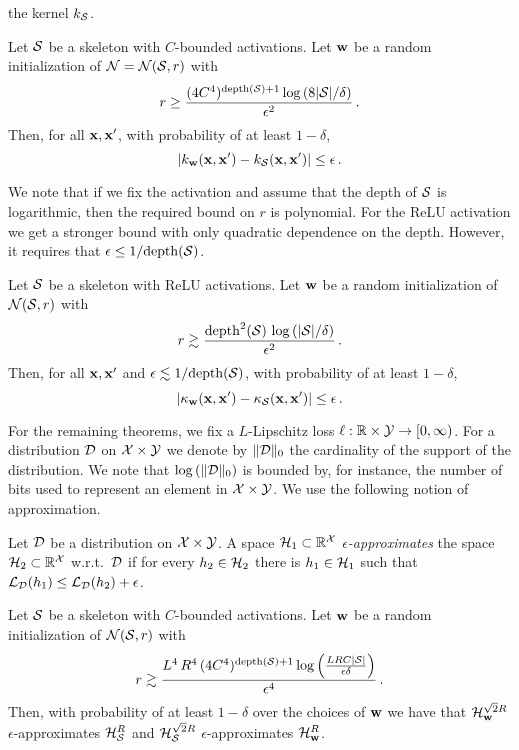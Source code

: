 the kernel $k_{\cal S}$.
\begin{theorem}\label{thm:main_ker}
Let ${\cal S}$ be a skeleton with $C$-bounded activations. Let ${\mathbf w}$ be a random
initialization of ${\cal N}={\cal N}({\cal S},r)$ with
$$r \ge \frac
	{(4C^4)^{\mathrm{depth}({\cal S})+1} \log\left({8|{\cal S}|}/{\delta}\right)}
	{\epsilon^2} \,.$$
Then, for all ${\mathbf x},{\mathbf x}'$, with probability of at least $1-\delta$,
$$|k_{\mathbf w}({\mathbf x},{\mathbf x}')-k_{\cal S}({\mathbf x},{\mathbf x}')|\le \epsilon\,.$$
\end{theorem}
%
\noindent We note that if we fix the activation and assume that the depth of ${\cal S}$ is
logarithmic, then the required bound on $r$ is polynomial. For the
ReLU activation we get a stronger bound with only quadratic dependence on
the depth. However, it requires that $\epsilon\le{1}/{\mathrm{depth}({\cal S})}$.
%
\begin{theorem}\label{thm:main_ker_ReLU}
Let ${\cal S}$ be a skeleton with ReLU activations. Let ${\mathbf w}$ be a random
initialization of ${\cal N}({\cal S},r)$ with
$$
	r \gtrsim \frac{\mathrm{depth}^2({\cal S}) \,
		\log\left({|{\cal S}|}/{\delta}\right)}
	{\epsilon^2} \,.
$$
Then, for all ${\mathbf x},{\mathbf x}'$ and $\epsilon\lesssim{}1/{\mathrm{depth}({\cal S})}$, with
probability of at least $1-\delta$,
$$ |\kappa_{\mathbf w}({\mathbf x},{\mathbf x}')-\kappa_{\cal S}({\mathbf x},{\mathbf x}')|\le \epsilon \,.$$
\end{theorem}
%
\noindent For the remaining theorems, we fix a $L$-Lipschitz loss
$\ell:{\mathbb R}\times{\cal Y}\to [0,\infty)$.  For a distribution ${\cal D}$ on
${\cal X}\times{\cal Y}$ we denote by $\|{\cal D}\|_0$ the cardinality of the support of
the distribution. We note that $\log\left(\|{\cal D}\|_0\right)$ is bounded by,
for instance, the number of bits used to represent an element in
${\cal X}\times{\cal Y}$. We use the following notion of approximation.
%
\begin{definition}
Let ${\cal D}$ be a distribution on ${\cal X}\times{\cal Y}$. A space
${\cal H}_1\subset{\mathbb R}^{\cal X}$ {\em $\epsilon$-approximates} the space
${\cal H}_2\subset{\mathbb R}^{\cal X}$ w.r.t.\ ${\cal D}$ if for every $h_2\in{\cal H}_2$ there is
$h_1\in{\cal H}_1$ such that ${\cal L}_{\cal D}(h_1)\le {\cal L}_{\cal D}(h_2)+\epsilon$.
\end{definition}
\begin{theorem}\label{thm:main_dist}
Let ${\cal S}$ be a skeleton with $C$-bounded activations. Let ${\mathbf w}$ be a random
initialization of ${\cal N}({\cal S},r)$ with
$$r \gtrsim \frac
	{L^4 \, R^4 \, (4C^4)^{\mathrm{depth}({\cal S})+1}
		\log\left(\frac{LRC |{\cal S}|}{\epsilon\delta}\right)}
	{\epsilon^4} \,.$$
Then, with probability of at least $1-\delta$ over the choices
of ${\mathbf w}$ we have that ${\cal H}_{\mathbf w}^{\sqrt{2}R}$ $\epsilon$-approximates
${\cal H}^R_{\cal S}$ and ${\cal H}_{\cal S}^{\sqrt{2}R}$ $\epsilon$-approximates ${\cal H}^R_{\mathbf w}$.
\end{theorem}
